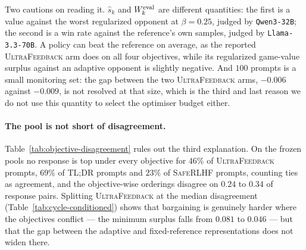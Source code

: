 \documentclass{article}
\theoremstyle{remark}
\theoremstyle{plain}
\begin{document}
Two cautions on reading it. $\hat s_k$ and $W_k^{\rm eval}$ are different quantities: the first is a
value against the worst regularized opponent at $\beta=0.25$, judged by \texttt{Qwen3-32B}; the
second is a win rate against the reference's own samples, judged by \texttt{Llama-3.3-70B}. A policy
can beat the reference on average, as the reported \textsc{UltraFeedback} arm does on all four
objectives, while its regularized game-value surplus against an adaptive opponent is slightly
negative. And $100$ prompts is a small monitoring set: the gap between the two
\textsc{UltraFeedback} arms, $-0.006$ against $-0.009$, is not resolved at that size, which is the
third and last reason we do not use this quantity to select the optimiser budget either.

\paragraph{The pool is not short of disagreement.}
Table~\ref{tab:objective-disagreement} rules out the third explanation. On the frozen pools no
response is top under every objective for $46\%$ of \textsc{UltraFeedback} prompts, $69\%$ of
\textsc{TL;DR} prompts and $23\%$ of \textsc{SafeRLHF} prompts, counting ties as agreement, and the
objective-wise orderings disagree on $0.24$ to $0.34$ of response pairs. Splitting
\textsc{UltraFeedback} at the median disagreement (Table~\ref{tab:cycle-conditioned}) shows that
bargaining is genuinely harder where the objectives conflict --- the minimum surplus falls from
$0.081$ to $0.046$ --- but that the gap between the adaptive and fixed-reference representations
does not widen there.
\end{document}
